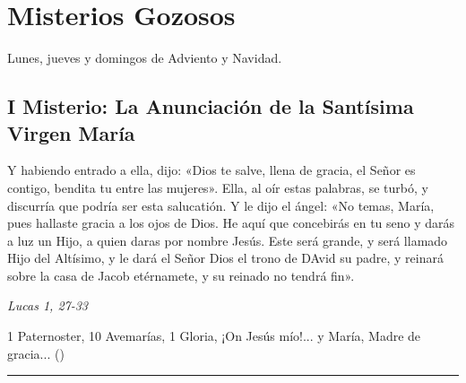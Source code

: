 \documentclass[./rosary.tex]{subfiles}
\begin{document}
\section*{Misterios Gozosos}
Lunes, jueves y domingos de Adviento y Navidad.

\subsection*{I Misterio: La Anunciación de la Santísima Virgen María}
Y habiendo entrado a ella, dijo: «Dios te salve, llena de gracia, el Señor es contigo, bendita tu entre las mujeres».
Ella, al oír estas palabras, se turbó, y discurría que podría ser esta salucatión. Y le dijo el ángel: «No temas, María,
pues hallaste gracia a los ojos de Dios. He aquí que concebirás en tu seno y darás a luz un Hijo, a quien daras por
nombre Jesús. Este será grande, y será llamado Hijo del Altísimo, y le dará el Señor Dios el trono de DAvid su padre,
y reinará sobre la casa de Jacob etérnamete, y su reinado no tendrá fin».

\begin{flushright}
      \emph{Lucas 1, 27-33}
\end{flushright}

1 Paternoster, 10 Avemarías, 1 Gloria, ¡On Jesús mío!... y María, Madre de gracia... ()

\rule{\textwidth}{0.5pt}
\end{document}
